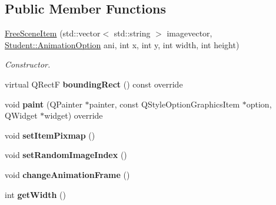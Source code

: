 \subsection*{Public Member Functions}
\begin{DoxyCompactItemize}
\item 
\hyperlink{class_student_1_1_free_scene_item_aa146330a348d99ce7a6511e1e4e4bc01}{Free\-Scene\-Item} (std\-::vector$<$ std\-::string $>$ imagevector, \hyperlink{class_student_1_1_animation_option}{Student\-::\-Animation\-Option} ani, int x, int y, int width, int height)
\begin{DoxyCompactList}\small\item\em Constructor. \end{DoxyCompactList}\item 
\hypertarget{class_student_1_1_free_scene_item_a8ab95b9fd571c8d0ea57eb9ffc5cde26}{virtual Q\-Rect\-F {\bfseries bounding\-Rect} () const override}\label{class_student_1_1_free_scene_item_a8ab95b9fd571c8d0ea57eb9ffc5cde26}

\item 
\hypertarget{class_student_1_1_free_scene_item_a1eec87fb6d45fb809d82d0115ea42a7b}{void {\bfseries paint} (Q\-Painter $\ast$painter, const Q\-Style\-Option\-Graphics\-Item $\ast$option, Q\-Widget $\ast$widget) override}\label{class_student_1_1_free_scene_item_a1eec87fb6d45fb809d82d0115ea42a7b}

\item 
\hypertarget{class_student_1_1_free_scene_item_a16a3f2ed270523d4da1716287b334349}{void {\bfseries set\-Item\-Pixmap} ()}\label{class_student_1_1_free_scene_item_a16a3f2ed270523d4da1716287b334349}

\item 
\hypertarget{class_student_1_1_free_scene_item_a03458d5da9de78766a7fa78e89a9f919}{void {\bfseries set\-Random\-Image\-Index} ()}\label{class_student_1_1_free_scene_item_a03458d5da9de78766a7fa78e89a9f919}

\item 
\hypertarget{class_student_1_1_free_scene_item_a50f2455baecc0ff06f5fb5324d2196cb}{void {\bfseries change\-Animation\-Frame} ()}\label{class_student_1_1_free_scene_item_a50f2455baecc0ff06f5fb5324d2196cb}

\item 
\hypertarget{class_student_1_1_free_scene_item_adc3f0b9d8a3a44dc3b371695e64e8d77}{int {\bfseries get\-Width} ()}\label{class_student_1_1_free_scene_item_adc3f0b9d8a3a44dc3b371695e64e8d77}


\end{DoxyCompactItemize}
